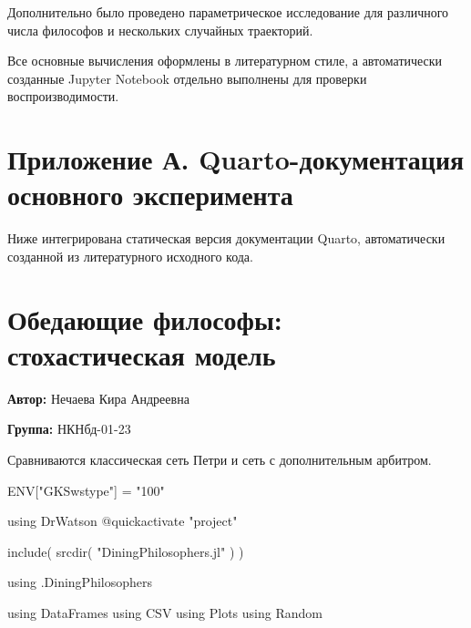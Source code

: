 \documentclass[
  english,
  russian,
  12pt,
  a4paper,
  DIV=11,
  numbers=noendperiod]{scrreprt}
\newenvironment{Shaded}{\begin{snugshade}}{\end{snugshade}}
\newcommand{\BuiltInTok}[1]{\textcolor[rgb]{0.00,0.23,0.31}{#1}}
\newcommand{\ConstantTok}[1]{\textcolor[rgb]{0.56,0.35,0.01}{#1}}
\newcommand{\FunctionTok}[1]{\textcolor[rgb]{0.28,0.35,0.67}{#1}}
\newcommand{\ImportTok}[1]{\textcolor[rgb]{0.00,0.46,0.62}{#1}}
\newcommand{\NormalTok}[1]{\textcolor[rgb]{0.00,0.23,0.31}{#1}}
\newcommand{\OperatorTok}[1]{\textcolor[rgb]{0.37,0.37,0.37}{#1}}
\newcommand{\PreprocessorTok}[1]{\textcolor[rgb]{0.68,0.00,0.00}{#1}}
\newcommand{\StringTok}[1]{\textcolor[rgb]{0.13,0.47,0.30}{#1}}
\begin{document}
Дополнительно было проведено параметрическое исследование для различного
числа философов и нескольких случайных траекторий.

Все основные вычисления оформлены в литературном стиле, а автоматически
созданные Jupyter Notebook отдельно выполнены для проверки
воспроизводимости.

\chapter*{Приложение А. Quarto-документация основного
эксперимента}\label{ux43fux440ux438ux43bux43eux436ux435ux43dux438ux435-ux430.-quarto-ux434ux43eux43aux443ux43cux435ux43dux442ux430ux446ux438ux44f-ux43eux441ux43dux43eux432ux43dux43eux433ux43e-ux44dux43aux441ux43fux435ux440ux438ux43cux435ux43dux442ux430}

Ниже интегрирована статическая версия документации Quarto, автоматически
созданной из литературного исходного кода.

\chapter{Обедающие философы: стохастическая
модель}\label{ux43eux431ux435ux434ux430ux44eux449ux438ux435-ux444ux438ux43bux43eux441ux43eux444ux44b-ux441ux442ux43eux445ux430ux441ux442ux438ux447ux435ux441ux43aux430ux44f-ux43cux43eux434ux435ux43bux44c}

\textbf{Автор:} Нечаева Кира Андреевна

\textbf{Группа:} НКНбд-01-23

Сравниваются классическая сеть Петри и сеть с дополнительным арбитром.

\begin{Shaded}
\begin{Highlighting}[]
\ConstantTok{ENV}\NormalTok{[}\StringTok{"GKSwstype"}\NormalTok{] }\OperatorTok{=} \StringTok{"100"}

\ImportTok{using} \BuiltInTok{DrWatson}
\PreprocessorTok{@quickactivate} \StringTok{"project"}

\FunctionTok{include}\NormalTok{(}
    \FunctionTok{srcdir}\NormalTok{(}
        \StringTok{"DiningPhilosophers.jl"}
\NormalTok{    )}
\NormalTok{)}

\ImportTok{using} \BuiltInTok{.DiningPhilosophers}

\ImportTok{using} \BuiltInTok{DataFrames}
\ImportTok{using} \BuiltInTok{CSV}
\ImportTok{using} \BuiltInTok{Plots}
\ImportTok{using} \BuiltInTok{Random}
\end{Highlighting}
\end{Shaded}
\end{document}

